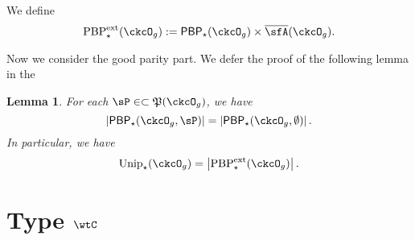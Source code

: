 \documentclass[12pt,a4paper]{amsart}
\def\abs#1{\left|{#1}\right|}
\newcommand{\CQ}{{\mathcal {Q}}}
\newcommand{\sgn}{\operatorname{sgn}}
\numberwithin{equation}{section}
\newtheorem{lem}[thm]{Lemma}
\theoremstyle{remark}
\def\Unip{\mathrm{Unip}}
\def\Cint#1{\Coh_{[#1]}}
\def\Coh{\mathrm{Coh}}
\def\CQ{\overline{\sfA}}%
\def\CPP{\mathfrak{P}}
\def\PBPes{\mathrm{PBP}^{\mathrm{ext}}_{\star}}
\begin{document}

We define
\[
 \PBPes(\ckcO_{g}) := \PBP_{\star}(\ckcO_{g})\times \CQ(\ckcO_{g}).
\]

Now we consider the good parity part. We defer the proof of the following lemma
in the 

\begin{lem}
  For each $\sP\in \subset \CPP(\ckcO_{g})$,
  we have
  \[
    \abs{\PBP_{\star}(\ckcO_{g},\sP)} =
    \abs{\PBP_{\star}(\ckcO_{g},\emptyset)}.
  \]
  In particular, we have
  \[
    \Unip_{\star}(\ckcO_{g}) = \abs{\PBPes(\ckcO_{g})}.
  \]
\end{lem}

\section{Type $\wtC$}
\end{document}
